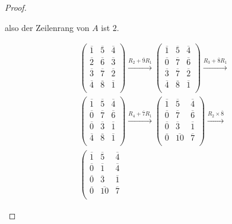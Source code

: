 \begin{proof}
\begin{parts}
		also der Zeilenrang von $A$ ist $2$.
	\item 
		\begin{gather*}
		\left(
\begin{array}{ccc}
 \overline{1} & \overline{5} & \overline{4} \\
 \overline{2} & \overline{6} & \overline{3} \\
 \overline{3} & \overline{7} & \overline{2} \\
 \overline{4} & \overline{8} & \overline{1} \\
\end{array}
\right) \xrightarrow{R_2+\overline{9}R_1} \left(
\begin{array}{ccc}
 \overline{1} & \overline{5} & \overline{4} \\
 \overline{0} & \overline{7} & \overline{6} \\
 \overline{3} & \overline{7} & \overline{2} \\
 \overline{4} & \overline{8} & \overline{1} \\
\end{array}
\right) \xrightarrow{R_3+\overline{8}R_1}\\ \left(
\begin{array}{ccc}
 \overline{1} & \overline{5} & \overline{4} \\
 \overline{0} & \overline{7} & \overline{6} \\
 \overline{0} & \overline{3} & \overline{1} \\
 \overline{4} & \overline{8} & \overline{1} \\
\end{array}
\right) \xrightarrow{R_4+\overline{7}R_1} \left(
\begin{array}{ccc}
 \overline{1} & \overline{5} & \overline{4} \\
 \overline{0} & \overline{7} & \overline{6} \\
 \overline{0} & \overline{3} & \overline{1} \\
 \overline{0} & \overline{10} & \overline{7} \\
\end{array}
\right) \xrightarrow{R_2\times \overline{8}}\\ \left(
\begin{array}{ccc}
 \overline{1} & \overline{5} & \overline{4} \\
 \overline{0} & \overline{1} & \overline{4} \\
 \overline{0} & \overline{3} & \overline{1} \\
 \overline{0} & \overline{10} & \overline{7} \\

\end{array}
\end{gather*}
\end{parts}
\end{proof}
